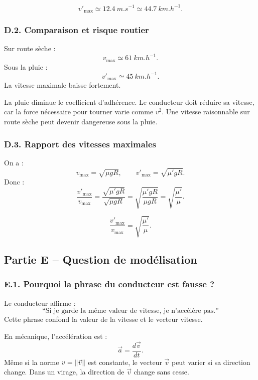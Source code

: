 \documentclass[11pt,a4paper]{article}
\begin{document}
\begin{resultatbox}
\[
\boxed{v'_{\max}\simeq \SI{12.4}{m.s^{-1}}\simeq \SI{44.7}{km.h^{-1}}.}
\]
\end{resultatbox}

\subsubsection*{D.2. Comparaison et risque routier}

Sur route sèche :
\[
v_{\max}\simeq \SI{61}{km.h^{-1}}.
\]
Sous la pluie :
\[
v'_{\max}\simeq \SI{45}{km.h^{-1}}.
\]
La vitesse maximale baisse fortement.

\begin{remarquebox}
La pluie diminue le coefficient d'adhérence. Le conducteur doit réduire sa vitesse, car la force nécessaire pour tourner varie comme $v^2$.
Une vitesse raisonnable sur route sèche peut devenir dangereuse sous la pluie.
\end{remarquebox}

\subsubsection*{D.3. Rapport des vitesses maximales}

On a :
\[
v_{\max}=\sqrt{\mu gR},
\qquad
v'_{\max}=\sqrt{\mu' gR}.
\]
Donc :
\[
\frac{v'_{\max}}{v_{\max}}
=
\frac{\sqrt{\mu'gR}}{\sqrt{\mu gR}}
=
\sqrt{\frac{\mu'gR}{\mu gR}}
=
\sqrt{\frac{\mu'}{\mu}}.
\]

\begin{resultatbox}
\[
\boxed{\frac{v'_{\max}}{v_{\max}}=\sqrt{\frac{\mu'}{\mu}}.}
\]
\end{resultatbox}

\subsection{Partie E -- Question de modélisation}

\subsubsection*{E.1. Pourquoi la phrase du conducteur est fausse ?}

Le conducteur affirme :
\[
\text{``Si je garde la même valeur de vitesse, je n'accélère pas.''}
\]
Cette phrase confond la valeur de la vitesse et le vecteur vitesse.

En mécanique, l'accélération est :
\[
\vec a=\frac{d\vec v}{dt}.
\]
Même si la norme $v=\norm{\vec v}$ est constante, le vecteur $\vec v$ peut varier si sa direction change.
Dans un virage, la direction de $\vec v$ change sans cesse.
\end{document}
